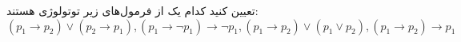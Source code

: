 تعیین کنید کدام یک از فرمول‌های زیر توتولوژی هستند:
$$
(p_1\to p_2)\vee (p_2\to p_1),(p_1\to \neg p_1)\to \neg p_1,(p_1\to p_2)\vee (p_1\vee p_2),(p_1\to p_2)\to p_1
$$
